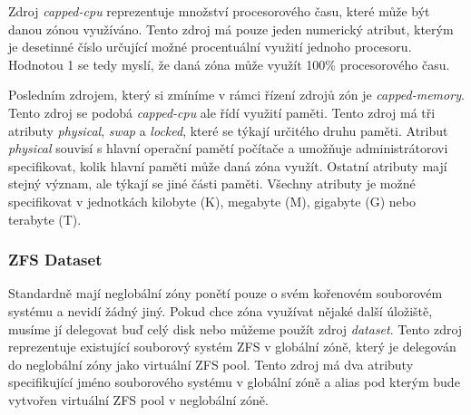 Zdroj \textit{capped-cpu} reprezentuje množství procesorového času, které může být danou zónou využíváno. Tento zdroj má pouze
jeden numerický atribut, kterým je desetinné číslo určující možné procentuální využití jednoho procesoru. Hodnotou 1 se tedy
myslí, že daná zóna může využít 100\% procesorového času.

Posledním zdrojem, který si zmíníme v rámci řízení zdrojů zón je \textit{capped-memory}. Tento zdroj se podobá \textit{capped-cpu}
ale řídí využití paměti. Tento zdroj má tři atributy \textit{physical}, \textit{swap} a \textit{locked}, které se týkají určitého
druhu paměti. Atribut \textit{physical} souvisí s hlavní operační pamětí počítače a umožňuje administrátorovi specifikovat,
kolik hlavní paměti může daná zóna využít. Ostatní atributy mají stejný význam, ale týkají se jiné části paměti. Všechny 
atributy je možné specifikovat v jednotkách kilobyte (K), megabyte (M), gigabyte (G) nebo terabyte (T).
\subsubsection{ZFS Dataset}
\label{chapter:zones:configuration:resources:dataset}
Standardně mají neglobální zóny ponětí pouze o svém kořenovém souborovém systému a nevidí žádný jiný. Pokud chce zóna využívat
nějaké další úložiště, musíme jí delegovat buď celý disk nebo můžeme použít zdroj \textit{dataset}. Tento zdroj reprezentuje
existující souborový systém ZFS v globální zóně, který je delegován do neglobální zóny jako virtuální ZFS pool. Tento zdroj
má dva atributy specifikující jméno souborového systému v globální zóně a alias pod kterým bude vytvořen virtuální ZFS pool
v neglobální zóně.
